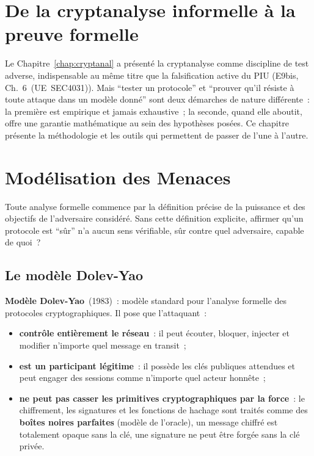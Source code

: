 \bigskip

\section*{De la cryptanalyse informelle à la preuve formelle}

Le Chapitre~\ref{chap:cryptanal} a présenté la cryptanalyse comme
discipline de test adverse, indispensable au même titre que la
falsification active du PIU (E9bis, Ch.~6~(UE~SEC4031)). Mais
``tester un protocole'' et ``prouver qu'il résiste à toute attaque
dans un modèle donné'' sont deux démarches de nature différente~:
la première est empirique et jamais exhaustive~; la seconde, quand
elle aboutit, offre une garantie mathématique au sein des hypothèses
posées. Ce chapitre présente la méthodologie et les outils qui
permettent de passer de l'une à l'autre.

\separateur

\section{Modélisation des Menaces}
\label{sec:modelisation-menaces}

Toute analyse formelle commence par la définition précise de la
puissance et des objectifs de l'adversaire considéré. Sans cette
définition explicite, affirmer qu'un protocole est ``sûr'' n'a
aucun sens vérifiable, sûr contre quel adversaire, capable de
quoi~?

\subsection{Le modèle Dolev-Yao}

\begin{boxdef}
\textbf{Modèle Dolev-Yao}~(1983)~: modèle standard pour l'analyse
formelle des protocoles cryptographiques. Il pose que l'attaquant~:
\begin{itemize}
    \item \textbf{contrôle entièrement le réseau}~: il peut écouter,
          bloquer, injecter et modifier n'importe quel message en
          transit~;
    \item \textbf{est un participant légitime}~: il possède les
          clés publiques attendues et peut engager des sessions
          comme n'importe quel acteur honnête~;
    \item \textbf{ne peut pas casser les primitives cryptographiques
          par la force}~: le chiffrement, les signatures et les
          fonctions de hachage sont traités comme des
          \textbf{boîtes noires parfaites} (modèle de l'oracle), 
          un message chiffré est totalement opaque sans la clé,
          une signature ne peut être forgée sans la clé privée.
\end{itemize}
\end{boxdef}


